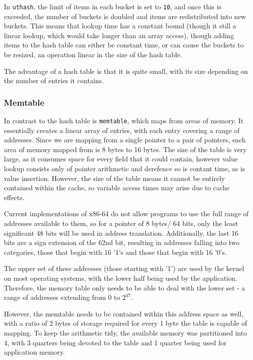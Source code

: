 In \verb!uthash!, the limit of items in each bucket is set to \verb!10!, and once this is exceeded, the number of buckets is doubled and items are redistributed into new buckets.
This means that lookup time has a constant bound (though it still a linear lookup, which would take longer than an array access), though adding items to the hash table can either be constant time, or can cause the buckets to be resized, an operation linear in the size of the hash table.

The advantage of a hash table is that it is quite small, with its size depending on the number of entries it contains.

\subsubsection{Memtable}

In contrast to the hash table is \verb!memtable!, which maps from areas of memory.
It essentially creates a linear array of entries, with each entry covering a range of addresses.
Since we are mapping from a single pointer to a pair of pointers, each area of memory mapped from is 8 bytes to 16 bytes.
The size of the table is very large, as it consumes space for every field that it could contain, however value lookup consists only of pointer arithmetic and derefence so is contant time, as is value insertion.
However, the size of the table means it cannot be entirely contained within the cache, so variable access times may arise due to cache effects.

Current implementations of x86-64 do not allow programs to use the full range of addresses available to them, so for a pointer of 8 bytes/ 64 bits, only the least significant 48 bits will be used in address translation.
Additionally, the last 16 bits are a sign extension of the 62nd bit, resulting in addresses falling into two categories, those that begin with 16 '1's and those that begin with 16 '0's.

The upper set of these addresses (those starting with '1') are used by the kernel on most operating systems, with the lower half being used by the application.
Therefore, the memory table only needs to be able to deal with the lower set - a range of addresses extending from $0$ to $2^{47}$.

However, the memtable needs to be contained within this address space as well, with a ratio of 2 bytes of storage required for every 1 byte the table is capable of mapping.
To keep the arithmetic tidy, the available memory was partitioned into 4, with 3 quarters being devoted to the table and 1 quarter being used for application memory.

